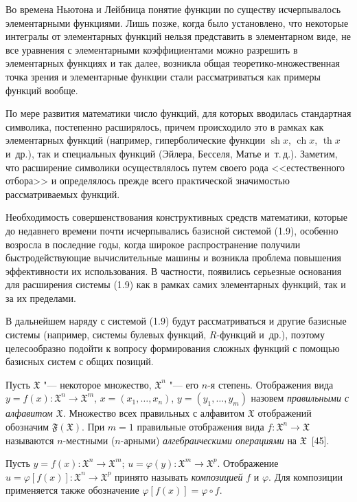 Во времена Ньютона и Лейбница понятие функции по существу исчерпывалось
элементарными функциями. Лишь позже, когда было установлено, что некоторые
интегралы от элементарных функций нельзя представить в элементарном виде,
не все уравнения с элементарными коэффициентами можно разрешить
в элементарных функциях и так далее, возникла общая
теоретико-множественная
%
точка зрения и элементарные функции стали рассматриваться как примеры
функций вообще.

По мере развития математики число функций, для которых вводилась
стандартная символика, постепенно расширялось, причем происходило это
в рамках как элементарных функций (например, гиперболические функции
$\operatorname{sh}x$, $\operatorname{ch}x$, $\operatorname{th}x$ и~др.),
так и специальных функций (Эйлера, Бесселя, Матье и~т.\,д.). Заметим, что
расширение символики осуществлялось путем своего рода <<естественного
отбора>> и определялось прежде всего практической значимостью
рассматриваемых функций.

Необходимость совершенствования конструктивных средств математики, которые
до недавнего времени почти исчерпывались базисной системой (1.9), особенно
возросла в последние годы, когда широкое распространение получили
быстродействующие вычислительные машины и возникла проблема повышения
эффективности их использования. В частности, появились серьезные основания
для расширения системы (1.9) как в рамках самих элементарных функций, так
и за их пределами.

В дальнейшем наряду с системой (1.9) будут рассматриваться и другие
базисные системы (например, системы булевых функций, $R$-функций и~др.),
поэтому целесообразно подойти к вопросу формирования сложных функций
с помощью базисных систем с общих позиций.

Пусть $\mathfrak X$ "--- некоторое множество, $\mathfrak X^n$ "--- его $n$-я
степень. Отображения вида
$y=f(x)\colon\mathfrak X^n\to\mathfrak X^m$, $x=(x_1,\dots,x_n)$,
$y=(y_1,\dots,y_m)$ назовем \emph{правильными с алфавитом $\mathfrak X$}.
Множество всех правильных с алфавитом $\mathfrak X$ отображений обозначим
$\mathfrak F(\mathfrak X)$. При $m=1$ правильные отображения вида
$f\colon\mathfrak X^n\to\mathfrak X$ называются $n$-местными ($n$-арными)
\emph{алгебраическими операциями} на $\mathfrak X$~[45].

Пусть $y=f(x)\colon\mathfrak X^n\to\mathfrak X^m$;
$u=\varphi(y)\colon\mathfrak X^m\to\mathfrak X^p$. Отображение
$u=\varphi[f(x)]\colon\mathfrak X^n\to\mathfrak X^p$ принято называть
\emph{композицией} $f$ и $\varphi$. Для композиции применяется также
обозначение $\varphi[f(x)]=\varphi\circ f$.

